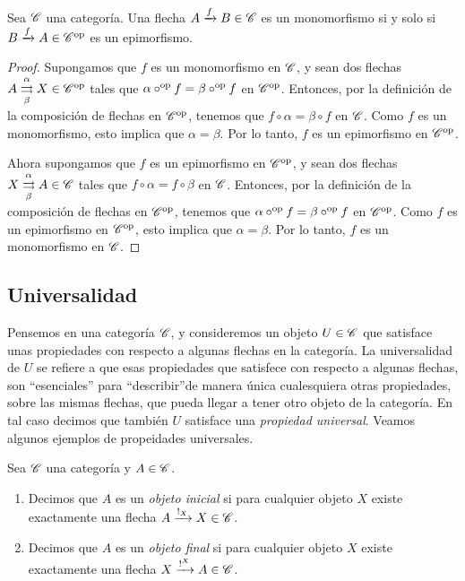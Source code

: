 \documentclass{comunicaciones}
\begin{document}
\begin{prop}
    Sea $\mathscr C$ una categoría. Una flecha $A\xrightarrow{f}B\in\mathscr C$ es un monomorfismo si y solo si $B\xrightarrow{f}A\in\mathscr C^{\mathrm{op}}$ es un epimorfismo.
\end{prop}
\begin{proof}
    Supongamos que $f$ es un monomorfismo en $\mathscr C$, y sean dos flechas $A\overset{\alpha}{\underset{\beta}{\rightrightarrows}}X\in\mathscr C^{\mathrm{op}}$ tales que
    $\alpha\circ^{\mathrm{op}} f=\beta\circ^{\mathrm{op}} f$ en $\mathscr C^{\mathrm{op}}$. Entonces, por la definición de la composición de flechas en $\mathscr C^{\mathrm{op}}$, tenemos que
    $f\circ\alpha=\beta\circ f$ en $\mathscr C$. Como $f$ es un monomorfismo, esto implica que $\alpha=\beta$. Por lo tanto, $f$ es un epimorfismo en $\mathscr C^{\mathrm{op}}$.

    Ahora supongamos que $f$ es un epimorfismo en $\mathscr C^{\mathrm{op}}$, y sean dos flechas $X\overset{\alpha}{\underset{\beta}{\rightrightarrows}}A\in\mathscr C$ tales que
    $f\circ\alpha=f\circ\beta$ en $\mathscr C$. Entonces, por la definición de la composición de flechas en $\mathscr C^{\mathrm{op}}$, tenemos que
    $\alpha\circ^{\mathrm{op}} f=\beta\circ^{\mathrm{op}} f$ en $\mathscr C^{\mathrm{op}}$. Como $f$ es un epimorfismo en $\mathscr C^{\mathrm{op}}$, esto implica que $\alpha=\beta$. Por lo tanto, $f$ es un monomorfismo en $\mathscr C$.
\end{proof}

\subsection{Universalidad}

Pensemos en una categoría $\mathscr C$, y consideremos un objeto $U\in\mathscr C$ que satisface unas propiedades con respecto a algunas flechas en la categoría. La universalidad de $U$ se refiere a que esas propiedades que satisfece con respecto a algunas flechas, son \textquotedblleft esenciales\textquotedblright  
para \textquotedblleft describir\textquotedblright de manera única cualesquiera otras propiedades, sobre las mismas flechas, que pueda llegar a tener otro objeto de la categoría. En tal caso decimos que también $U$ satisface una \emph{propiedad universal}. Veamos algunos ejemplos de propeidades universales.

\begin{dfn}
    Sea $\mathscr C$ una categoría y $A\in\mathscr C$.
    \begin{enumerate}
        \item Decimos que $A$ es un \emph{objeto inicial} si para cualquier objeto $X$ existe exactamente una flecha $A\xrightarrow{!_X}X\in\mathscr C$. 
        \item Decimos que $A$ es un \emph{objeto final} si para cualquier objeto $X$ existe exactamente una flecha $X\xrightarrow{!^X}A\in\mathscr C$.
    \end{enumerate}
\end{dfn}
\end{document}
